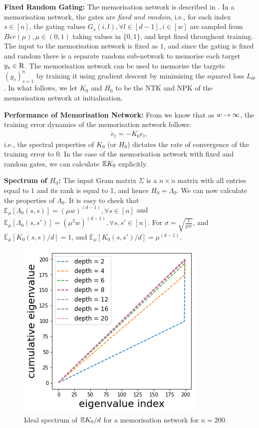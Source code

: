 \textbf{Fixed Random Gating:} The memorisation network is described in . In a memorisation network, the gates are \emph{fixed and random}, i.e., for each index $s\in[n]$, the gating values $G_{s}(i,l),\forall l\in[d-1], i\in[w] $ are sampled from $Ber(\mu), \mu\in(0,1)$ taking values in $\{0,1\}$,  and kept fixed throughout training. The input to the memorisation network is fixed as $1$, and since the gating is fixed and random there is a separate random sub-network to memorise each target $y_s\in\mathrm{R}$. The memorisation network can be used to memorise the targets  $(y_s)_{s=1}^n$ by training it using gradient descent by minimising the squared loss $L_{\Theta}$. In what follows, we let $K_0$ and $H_0$ to be the NTK and NPK of the memorisation network at initialisation.


\textbf{Performance of Memorisation Network:} From  we know that as $w\rightarrow\infty$, the training error dynamics of the memorisation network follows:
\begin{align}
\dot{e}_t=-K_{0} e_t,
\end{align}
i.e., the spectral properties of $K_0$ (or $H_0$) dictates the rate of convergence of the training error to $0$. In the case of the memorisation network with fixed and random gates, we can calculate $\mathbb{E}{K_0}$ explicitly. 

\textbf{Spectrum of $H_0$:} The input Gram matrix $\Sigma$ is a $n\times n$ matrix with all entries equal to $1$ and its rank is equal to 1, and hence $H_0=\Lambda_0$. We can now calculate the properties of $\Lambda_0$. It is easy to check that $\mathbb{E}_{\mu}\left[\Lambda_0(s,s)\right]=(\mu w)^{(d-1)},\forall s\in[n]$ and $\mathbb{E}_{\mu}\left[\Lambda_0(s,s')\right]=(\mu^2 w)^{(d-1)},\forall s,s'\in[n]$.  For $\sigma=\sqrt{\frac{1}{\mu w}}$, and $\mathbb{E}_{\mu}\left[K_0(s,s)/d\right]=1$, and $\mathbb{E}_{\mu}\left[K_0(s,s')/d\right]=\mu^{(d-1)}$. 
\begin{figure}
\centering
\includegraphics[scale=0.3]{figs/dgn-fra-ecdf-ideal-small.png}
\caption{Ideal spectrum of $\mathbb{E}{K_0}/d$ for a memorisation network for $n=200$.}
\label{fig:ideal-spectrum}
\end{figure}


